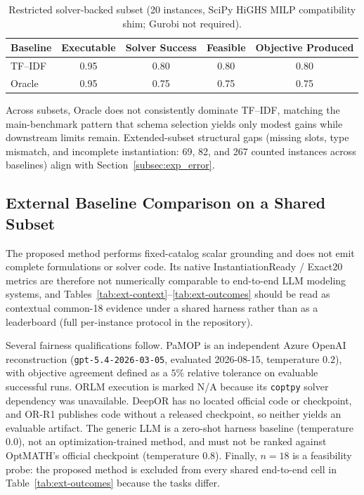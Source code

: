 \documentclass[pdflatex,sn-basic,Numbered]{sn-jnl}
\begin{document}
\begin{table}[t]
\centering
\caption{Restricted solver-backed subset (20 instances, SciPy HiGHS MILP compatibility shim; Gurobi not required).}
\label{tab:eng-solver}
\small
\begin{tabular}{lcccc}
  \toprule
  Baseline & Executable & Solver Success & Feasible & Objective Produced \\
  \midrule
  TF--IDF & 0.95 & 0.80 & 0.80 & 0.80 \\
  Oracle  & 0.95 & 0.75 & 0.75 & 0.75 \\
  \bottomrule
\end{tabular}
\end{table}

Across subsets, Oracle does not consistently dominate TF--IDF, matching the main-benchmark pattern that schema selection yields only modest gains while downstream limits remain. Extended-subset structural gaps (missing slots, type mismatch, and incomplete instantiation: 69, 82, and 267 counted instances across baselines) align with Section~\ref{subsec:exp_error}.

\subsection{External Baseline Comparison on a Shared Subset}
\label{subsec:exp_external}

The proposed method performs fixed-catalog scalar grounding and does not emit complete formulations or solver code. Its native InstantiationReady / Exact20 metrics are therefore not numerically comparable to end-to-end LLM modeling systems, and Tables~\ref{tab:ext-context}--\ref{tab:ext-outcomes} should be read as contextual common-18 evidence under a shared harness rather than as a leaderboard (full per-instance protocol in the repository).

Several fairness qualifications follow. PaMOP is an independent Azure OpenAI reconstruction (\texttt{gpt-5.4-2026-03-05}, evaluated 2026-08-15, temperature $0.2$), with objective agreement defined as a $5\%$ relative tolerance on evaluable successful runs. ORLM execution is marked N/A because its \texttt{coptpy} solver dependency was unavailable. DeepOR has no located official code or checkpoint, and OR-R1 publishes code without a released checkpoint, so neither yields an evaluable artifact. The generic LLM is a zero-shot harness baseline (temperature $0.0$), not an optimization-trained method, and must not be ranked against OptMATH's official checkpoint (temperature $0.8$). Finally, $n=18$ is a feasibility probe: the proposed method is excluded from every shared end-to-end cell in Table~\ref{tab:ext-outcomes} because the tasks differ.
\end{document}
